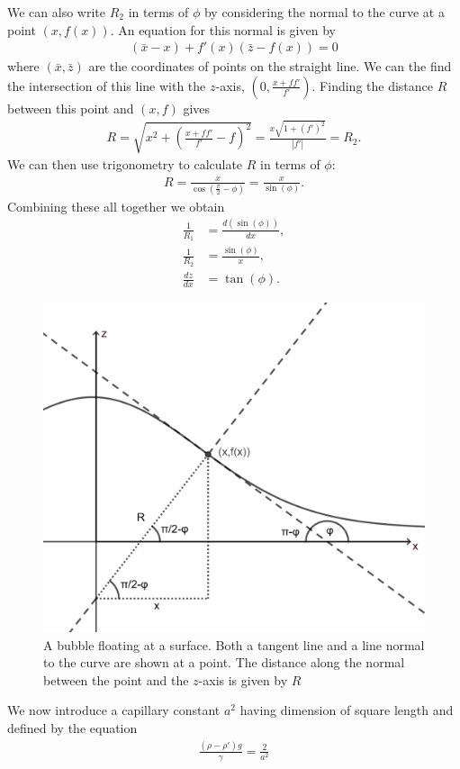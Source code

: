 We can also write $R_2$ in terms of $\phi$ by considering the normal to the curve at a point $(x,f(x))$. An equation for this normal is given by
\begin{align}
    (\bar{x}-x) + f'(x)(\bar{z}-f(x))=0
\end{align}
where $(\bar{x},\bar{z})$ are the coordinates of points on the straight line. We can the find the intersection of this line with the $z$-axis, $(0,\frac{x+ff'}{f'})$.
Finding the distance $R$ between this point and $(x,f)$ gives
\begin{align}
    R=\sqrt{x^2+(\frac{x+ff'}{f'}-f)^2}=\frac{x\sqrt{1+(f')^2}}{|f'|}=R_2.
\end{align}
We can then use trigonometry to calculate $R$ in terms of $\phi$:
\begin{align}
    R=\frac{x}{\cos(\frac{\pi}{2}-\phi)}=\frac{x}{\sin(\phi)}.
\end{align}
Combining these all together we obtain
\begin{align}
    \frac{1}{R_1}&=\frac{d(\sin(\phi))}{dx},\\
    \frac{1}{R_2}&=\frac{\sin(\phi)}{x},\\
    \frac{dz}{dx} &= \tan(\phi).
\end{align}
\begin{figure}[hb]
    \centering
    \includegraphics[width=0.6\linewidth]{WriteUp/images/angles and trig.png}
    \caption{A bubble floating at a surface. Both a tangent line and a line normal to the curve are shown at a point. The distance along the normal between the point and the $z$-axis is given by $R$}
    \label{fig:4}
\end{figure}
We now introduce a capillary constant $a^2$ having dimension of square length and defined by the equation
\begin{align}
    \frac{(\rho-\rho')g}{\gamma} = \frac{2}{a^2}
\end{align}
